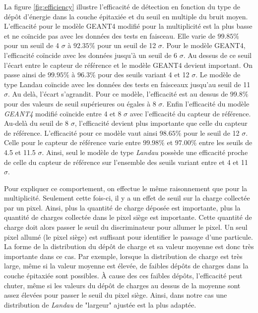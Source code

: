    La figure \ref{fig:efficiency} illustre l'efficacit\'e de d\'etection en fonction du type de d\'epôt d'\'energie dans la couche épitaxiée et du seuil en multiple du bruit moyen. L'efficacit\'e pour le mod\`ele  GEANT4 modifi\'e pour la multiplicit\'e est la plus basse et ne coïncide pas avec les donn\'ees des tests en faisceau. Elle varie de $99.85\%$ pour un seuil de 4 $\sigma$ \`a $92.35\%$ pour un seuil de 12 $\sigma$. Pour le mod\`ele GEANT4, l'efficacit\'e coïncide avec les donn\'ees jusqu'à un seuil de 6 $\sigma$. Au dessus de ce seuil l'\'ecart entre le capteur de r\'ef\'erence et le mod\`ele GEANT4 devient important. On passe ainsi de $99.95\%$ \`a $96.3\%$ pour des seuils variant 4 et 12 $\sigma$. Le mod\`ele de type Landau coïncide avec les donn\'ees des tests en faisceaux jusqu'au seuil de 11 $\sigma$. Au delà, l'\'ecart s'agrandit. Pour ce mod\`ele, l'efficacit\'e est au dessus de $99.8\%$ pour des valeurs de seuil sup\'erieures ou \'egales \`a 8 $\sigma$. Enfin l'efficacit\'e du mod\`ele \textit{GEANT4} modifi\'e co\"incide entre 4 et 8 $\sigma$ avec l'efficacit\'e du capteur de r\'ef\'erence. Au-delà du seuil de 8 $\sigma$, l'efficacit\'e devient plus importante que celle du capteur de r\'ef\'erence. L'efficacit\'e pour ce mod\`ele vaut ainsi $98.65\%$ pour le seuil de 12 $\sigma$. Celle pour le capteur de r\'ef\'erence varie entre $99.98\%$ et $97.00\%$ entre les seuils de 4.5 et 11.5 $\sigma$. Ainsi, seul le mod\`ele de type \textit{Landau} poss\`ede une efficacit\'e proche de celle du capteur de r\'ef\'erence sur l'ensemble des seuils variant entre et 4 et 11 $\sigma$.
   
   \medskip
   
   Pour expliquer ce comportement, on effectue le m\^eme raisonnement que pour la multiplicit\'e. Seulement cette fois-ci, il y a un effet de seuil sur la charge collect\'ee par un pixel. Ainsi, plus la quantit\'e de charge d\'epos\'ee est importante, plus la quantit\'e de charges collect\'ee dans le pixel si\`ege est importante. Cette quantit\'e de charge doit alors passer le seuil du discriminateur pour allumer le pixel. Un seul pixel allum\'e (le pixel si\`ege) est suffisant pour identifier le passage d'une particule. La forme de la distribution du d\'epôt de charge et sa valeur moyenne est donc tr\`es importante dans ce cas. Par exemple, lorsque la distribution de charge est tr\`es large, m\^eme si la valeur moyenne est \'elev\'ee, de faibles d\'ep\^ots de charges dans la couche \'epitaxi\'ee sont possibles. \`A cause des ces faibles d\'ep\^ots, l'efficacit\'e peut chuter, m\^eme si les valeurs du d\'epôt de charges au dessus de la moyenne sont assez \'elev\'ees pour passer le seuil du pixel si\`ege. Ainsi, dans notre cas une distribution de \textit{Landau} de "largeur" ajust\'ee est la plus adapt\'ee.
   
